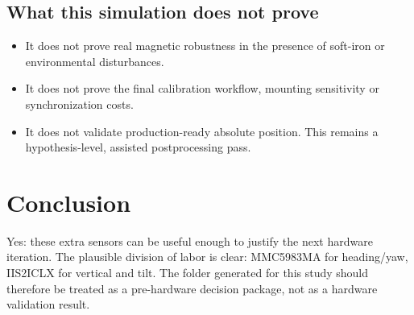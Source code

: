 \documentclass[11pt,a4paper]{article}
\begin{document}
\subsection*{What this simulation does not prove}
\begin{itemize}[leftmargin=1.4em]
\item It does not prove real magnetic robustness in the presence of soft-iron or environmental disturbances.
\item It does not prove the final calibration workflow, mounting sensitivity or synchronization costs.
\item It does not validate production-ready absolute position. This remains a hypothesis-level, assisted postprocessing pass.
\end{itemize}
\section{Conclusion}
Yes: these extra sensors can be useful enough to justify the next hardware iteration. The plausible division of labor is clear: MMC5983MA for heading/yaw, IIS2ICLX for vertical and tilt. The folder generated for this study should therefore be treated as a pre-hardware decision package, not as a hardware validation result.
\end{document}

